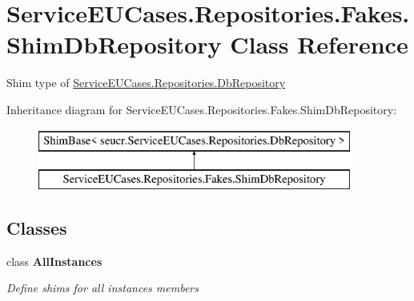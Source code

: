 \hypertarget{class_service_e_u_cases_1_1_repositories_1_1_fakes_1_1_shim_db_repository}{\section{Service\-E\-U\-Cases.\-Repositories.\-Fakes.\-Shim\-Db\-Repository Class Reference}
\label{class_service_e_u_cases_1_1_repositories_1_1_fakes_1_1_shim_db_repository}
}


Shim type of \hyperlink{class_service_e_u_cases_1_1_repositories_1_1_db_repository}{Service\-E\-U\-Cases.\-Repositories.\-Db\-Repository} 


Inheritance diagram for Service\-E\-U\-Cases.\-Repositories.\-Fakes.\-Shim\-Db\-Repository\-:\begin{figure}[H]
\begin{center}
\leavevmode
\includegraphics[height=2.000000cm]{class_service_e_u_cases_1_1_repositories_1_1_fakes_1_1_shim_db_repository}
\end{center}
\end{figure}
\subsection*{Classes}
\begin{DoxyCompactItemize}
\item 
class {\bfseries All\-Instances}
\begin{DoxyCompactList}\small\item\em Define shims for all instances members\end{DoxyCompactList}\end{DoxyCompactItemize}
